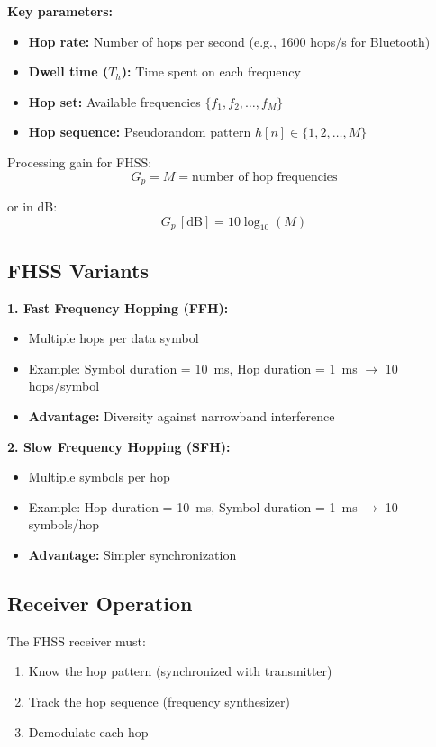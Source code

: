 \textbf{Key parameters:}
\begin{itemize}
\item \textbf{Hop rate:} Number of hops per second (e.g., 1600 hops/s for Bluetooth)
\item \textbf{Dwell time ($T_h$):} Time spent on each frequency
\item \textbf{Hop set:} Available frequencies $\{f_1, f_2, \ldots, f_M\}$
\item \textbf{Hop sequence:} Pseudorandom pattern $h[n] \in \{1, 2, \ldots, M\}$
\end{itemize}

Processing gain for FHSS:
\begin{equation}
G_p = M = \text{number of hop frequencies}
\end{equation}

or in dB:
\begin{equation}
G_p\,[\mathrm{dB}] = 10\log_{10}(M)
\end{equation}

\subsection{FHSS Variants}

\textbf{1. Fast Frequency Hopping (FFH):}
\begin{itemize}
\item Multiple hops per data symbol
\item Example: Symbol duration = 10~ms, Hop duration = 1~ms $\rightarrow$ 10 hops/symbol
\item \textbf{Advantage:} Diversity against narrowband interference
\end{itemize}

\textbf{2. Slow Frequency Hopping (SFH):}
\begin{itemize}
\item Multiple symbols per hop
\item Example: Hop duration = 10~ms, Symbol duration = 1~ms $\rightarrow$ 10 symbols/hop
\item \textbf{Advantage:} Simpler synchronization
\end{itemize}

\subsection{Receiver Operation}

The FHSS receiver must:
\begin{enumerate}
\item Know the hop pattern (synchronized with transmitter)
\item Track the hop sequence (frequency synthesizer)
\item Demodulate each hop
\end{enumerate}

